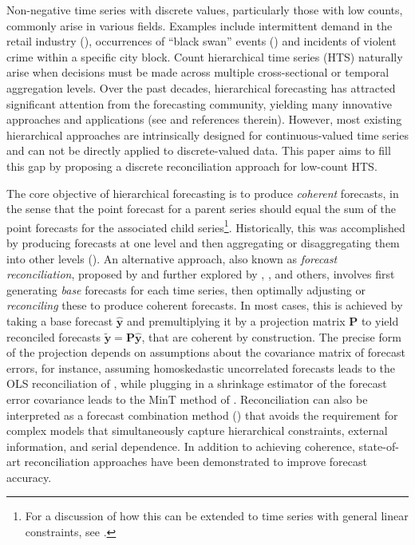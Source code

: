 \documentclass[a4paper,review,11pt,authoryear]{elsarticle}
\theoremstyle{definition}
\begin{document}
Non-negative time series with discrete values, particularly those with low counts, commonly arise in various fields.
Examples include intermittent demand in the retail industry (\citealp{kourentzesElucidateStructureIntermittent2021}), occurrences of ``black swan'' events (\citealp{nikolopoulosWeNeedTalk2020}) and incidents of violent crime within a specific city block.
Count hierarchical time series (HTS) naturally arise when decisions must be made across multiple cross-sectional or temporal aggregation levels. Over the past decades, hierarchical forecasting has attracted significant attention from the forecasting community, yielding many innovative approaches and applications (see \citealp{athanasopoulosForecastReconciliationReview2023} and references therein). However, most existing hierarchical approaches are intrinsically designed for continuous-valued time series and can not be directly applied to discrete-valued data. This paper aims to fill this gap by proposing a discrete reconciliation approach for low-count HTS.

The core objective of hierarchical forecasting is to produce \textit{coherent} forecasts,
in the sense that the point forecast for a parent series should equal the sum of the point forecasts for the associated child series\footnote{For a discussion of how this can be extended to time series with general linear constraints, see \cite{girolimetto2023point}.}. Historically, this was accomplished by producing forecasts at one level
and then aggregating or disaggregating them into other levels (\citealp{fliednerHierarchicalForecastingIssues2001}).
An alternative approach, also known as \textit{forecast reconciliation}, proposed by \cite{hyndmanOptimalCombinationForecasts2011} and further explored by \cite{wickramasuriyaOptimalForecastReconciliation2019}, \cite{panagiotelisForecastReconciliationGeometric2021}, and others, involves first generating \textit{base} forecasts for each time series,
then optimally adjusting or \textit{reconciling} these to produce coherent forecasts. In most cases, this is achieved by taking a base forecast $\hat{\bm{y}}$ and premultiplying it by a projection matrix $\mathbf{P}$ to yield reconciled forecasts $\tilde{\bm{y}}=\mathbf{P}\hat{\bm{y}}$, that are coherent by construction. The precise form of the projection depends on assumptions about the covariance matrix of forecast errors, for instance, assuming homoskedastic uncorrelated forecasts leads to the OLS reconciliation of \cite{hyndmanOptimalCombinationForecasts2011}, while plugging in a shrinkage estimator of the forecast error covariance leads to the MinT method of \cite{wickramasuriyaOptimalForecastReconciliation2019}. Reconciliation can also be interpreted as a forecast combination method (\citealp{hollymanUnderstandingForecastReconciliation2021}) that avoids the requirement for complex models that simultaneously capture hierarchical constraints, external information, and serial dependence. In addition to achieving coherence, state-of-art reconciliation approaches have been demonstrated to improve forecast accuracy.
\end{document}
